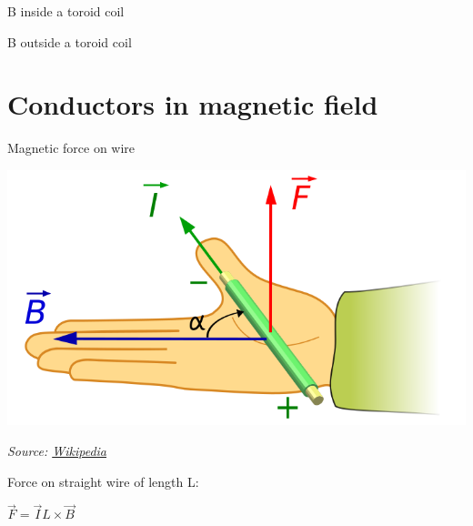 \documentclass[compress]{beamer}
\newcommand{\source}[2]{{\tiny\it Source: \href{#1}{#2}}}
\begin{document}

{
    \begin{frame}{B inside a toroid coil}
    \end{frame}
}


{
    \begin{frame}{B outside a toroid coil}
    \end{frame}
}


\section[Force]{Conductors in magnetic field}


\begin{frame}{Magnetic force on wire}

    \begin{center}
        \includegraphics[width=0.8\linewidth]{lorentz-force-right-hand-rule}

        \source{https://en.wikipedia.org/wiki/Lorentz_force}{Wikipedia}
    \end{center}

    Force on straight wire of length L:

    \begin{center}
    \Large
    $\vec{F} = \vec{I} L \times \vec{B}$
    \end{center}

\end{frame}

\end{document}
